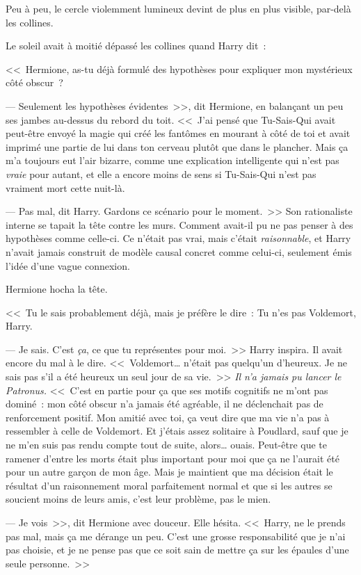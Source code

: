 Peu à peu, le cercle violemment lumineux devint de plus en plus visible, par-delà les collines.

Le soleil avait à moitié dépassé les collines quand Harry dit~:

<<~Hermione, as-tu déjà formulé des hypothèses pour expliquer mon mystérieux côté obscur~?

--- Seulement les hypothèses évidentes~>>, dit Hermione, en balançant un peu ses jambes au-dessus du rebord du toit. <<~J'ai pensé que Tu-Sais-Qui avait peut-être envoyé la magie qui créé les fantômes en mourant à côté de toi et avait imprimé une partie de lui dans ton cerveau plutôt que dans le plancher. Mais ça m'a toujours eut l'air bizarre, comme une explication intelligente qui n'est pas \emph{vraie} pour autant, et elle a encore moins de sens si Tu-Sais-Qui n'est pas vraiment mort cette nuit-là.

--- Pas mal, dit Harry. Gardons ce scénario pour le moment.~>> Son rationaliste interne se tapait la tête contre les murs. Comment avait-il pu ne pas penser à des hypothèses comme celle-ci. Ce n'était pas vrai, mais c'était \emph{raisonnable}, et Harry n'avait jamais construit de modèle causal concret comme celui-ci, seulement émis l'idée d'une vague connexion.

Hermione hocha la tête.

<<~Tu le sais probablement déjà, mais je préfère le dire~: Tu n'es pas Voldemort, Harry.

--- Je sais. C'est \emph{ça}, ce que tu représentes pour moi.~>> Harry inspira. Il avait encore du mal à le dire. <<~Voldemort… n'était pas quelqu'un d'heureux. Je ne sais pas s'il a été heureux un seul jour de sa vie.~>> \emph{Il n'a jamais pu lancer le Patronus.} <<~C'est en partie pour ça que ses motifs cognitifs ne m'ont pas dominé~: mon côté obscur n'a jamais été agréable, il ne déclenchait pas de renforcement positif. Mon amitié avec toi, ça veut dire que ma vie n'a pas à ressembler à celle de Voldemort. Et j'étais assez solitaire à Poudlard, sauf que je ne m'en suis pas rendu compte tout de suite, alors… ouais. Peut-être que te ramener d'entre les morts était plus important pour moi que ça ne l'aurait été pour un autre garçon de mon âge. Mais je maintient que ma décision était le résultat d'un raisonnement moral parfaitement normal et que si les autres se soucient moins de leurs amis, c'est leur problème, pas le mien.

--- Je vois~>>, dit Hermione avec douceur. Elle hésita. <<~Harry, ne le prends pas mal, mais ça me dérange un peu. C'est une grosse responsabilité que je n'ai pas choisie, et je ne pense pas que ce soit sain de mettre ça sur les épaules d'une seule personne.~>>

